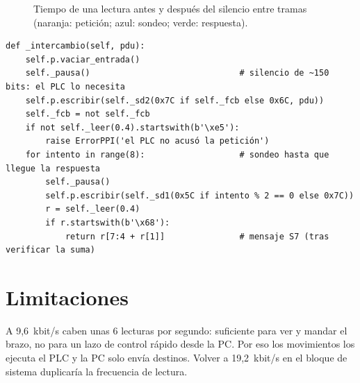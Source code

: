 \begin{figure}[H]
\centering
{}
\caption{Tiempo de una lectura antes y después del silencio entre tramas (naranja: petición; azul: sondeo; verde: respuesta).}
\end{figure}

\begin{lstlisting}[style=py, caption={Núcleo del intercambio (\texttt{app/ppi.py}).}]
def _intercambio(self, pdu):
    self.p.vaciar_entrada()
    self._pausa()                              # silencio de ~150 bits: el PLC lo necesita
    self.p.escribir(self._sd2(0x7C if self._fcb else 0x6C, pdu))
    self._fcb = not self._fcb
    if not self._leer(0.4).startswith(b'\xe5'):
        raise ErrorPPI('el PLC no acusó la petición')
    for intento in range(8):                   # sondeo hasta que llegue la respuesta
        self._pausa()
        self.p.escribir(self._sd1(0x5C if intento % 2 == 0 else 0x7C))
        r = self._leer(0.4)
        if r.startswith(b'\x68'):
            return r[7:4 + r[1]]               # mensaje S7 (tras verificar la suma)
\end{lstlisting}

\section{Limitaciones}
A 9,6~kbit/s caben unas 6 lecturas por segundo: suficiente para ver y mandar el brazo, no para un lazo de control rápido desde la PC. Por eso los movimientos los ejecuta el PLC y la PC solo envía destinos. Volver a 19,2~kbit/s en el bloque de sistema duplicaría la frecuencia de lectura.
